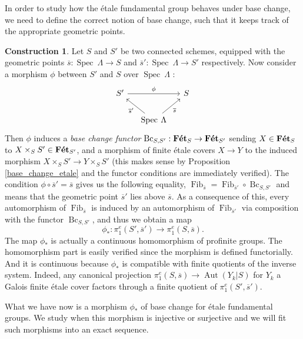 \documentclass{article}
\theoremstyle{plain}
\theoremstyle{definition}
\newtheorem{construction}[theorem]{Construction}
\DeclareMathOperator{\Fib}{Fib}
\DeclareMathOperator{\Bc}{Bc}
\DeclareMathOperator{\Aut}{Aut}
\DeclareMathOperator{\Spec}{Spec}
\DeclareMathOperator{\Fet}{\bf{F\acute{e}t}}
\begin{document}
In order to study how the \'etale fundamental group behaves under base change, we need to define the correct notion of base change, such that it keeps track of the appropriate geometric points.
\begin{construction}
    Let $S$ and $S'$ be two connected schemes, equipped with the geometric points $\overline{s}:\Spec\:\Lambda\rightarrow S$ and $\overline{s}':\Spec\:\Lambda \rightarrow S'$ respectively. 
    Now consider a morphism $\phi$ between $S'$ and $S$ over $\Spec\:\Lambda$ : 
    \[
    \begin{tikzcd}[column sep=small]
        S'\arrow[rr,"\phi"] && S\\
        &\Spec\:\Lambda \arrow[ul, "\overline{s}'"]\arrow[ur, "\overline{s}"']
    \end{tikzcd}
    \]
    Then $\phi$ induces a \textit{base change functor} $\Bc_{S,S'} : \Fet_S\rightarrow \Fet_{S'}$ sending $X\in\Fet_S$ to $X\times_SS'\in\Fet_{S'}$, and a morphism of finite \'etale covers $X\rightarrow Y$ to the induced morphism $X\times_SS'\rightarrow Y\times_SS'$ 
    (this makes sense by Proposition \ref{base_change_etale} and the functor conditions are immediately verified).
    The condition $\phi\circ\overline{s}' = \overline{s}$ gives us the following equality, $\Fib_{\overline{s}}= \Fib_{\overline{s}'}\circ \Bc_{S,S'}$ and means that the geometric point $\overline{s}'$ lies above $\overline{s}$.
    As a consequence of this, every automorphism of $\Fib_{\overline{s}}$ is induced by an automorphism of $\Fib_{\overline{s}'}$ via composition with the functor $\Bc_{S,S'}$, and thus we obtain a map 
    $$\phi_* : \pi^e_1(S',\overline{s}')\rightarrow \pi^e_1(S,\overline{s}).$$
    The map $\phi_*$ is actually a continuous homomorphism of profinite groups. 
    The homomorphism part is easily verified since the morphism is defined functorially.
    And it is continuous because $\phi_*$ is compatible with finite quotients of the inverse system. 
    Indeed, any canonical projection $\pi^e_1(S,\overline{s})\rightarrow \Aut(Y_k|S)$ for $Y_k$ a Galois finite \'etale cover factors through a finite quotient of $\pi^e_1(S',\overline{s}')$.
\end{construction}


\noindent What we have now is a morphism $\phi_*$ of base change for \'etale fundamental groups. 
We study when this morphism is injective or surjective and we will fit such morphisms into an exact sequence.
\end{document}
